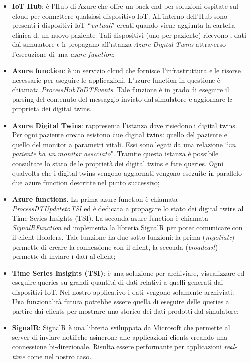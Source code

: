 \begin{itemize}

    \item \textbf{IoT Hub}: è l'Hub di Azure che offre un back-end per soluzioni ospitate sul cloud per connettere qualsiasi dispositivo IoT. All'interno dell'Hub sono presenti i dispositivi IoT ``\textit{virtuali}" creati quando viene aggiunta la cartella clinica di un nuovo paziente. Tali dispositivi (uno per paziente) ricevono i dati dal simulatore e li propagano all'istanza \textit{Azure Digital Twins} attraverso l'esecuzione di una \textit{azure function};
    
    \item \textbf{Azure function}: è un servizio cloud che fornisce l'infrastruttura e le risorse necessarie per eseguire le applicazioni. L'azure function in questione è chiamata \textit{ProcessHubToDTEvents}. Tale funzione è in grado di eseguire il parsing del contenuto del messaggio inviato dal simulatore e aggiornare le proprietà dei digital twins.
    
    \item \textbf{Azure Digital Twins}: rappresenta l'istanza dove risiedono i digital twins. Per ogni paziente creato esistono due digital twins: quello del paziente e quello del monitor a parametri vitali. Essi sono legati da una relazione ``\textit{un paziente ha un monitor associato}". Tramite questa istanza è possibile consultare lo stato delle proprietà dei digital twins e fare queries. Ogni qualvolta che i digital twins vengono aggiornati vengono eseguite in parallelo due azure function descritte nel punto successivo;
    
    \item \textbf{Azure functions}. La prima azure function è chiamata \textit{ProcessDTUpdatetoTSI} ed è dedicata a propagare lo stato dei digital twins al Time Series Insights (TSI). La seconda azure function è chiamata \textit{SignalRFunction} ed implementa la libreria SignalR per poter comunicare con il client Hololens. Tale funzione ha due sotto-funzioni: la prima (\textit{negotiate}) permette di creare la connessione con il client, la seconda (\textit{broadcast}) permette di inviare i dati al client;
    
    \item \textbf{Time Series Insights (TSI)}: è una soluzione per archiviare, visualizzare ed eseguire queries su grandi quantità di dati relativi a quelli generati dai dispositivi IoT. Nel nostro applicativo i dati vengono solamente archiviati. Una funzionalità futura potrebbe essere quella di eseguire delle queries a partire dai clients per mostrare uno storico dei dati prodotti dal simulatore;
    
    \item \textbf{SignalR}: SignalR è una libreria sviluppata da Microsoft che permette al server di inviare notifiche asincrone alle applicazioni clients creando una connessione bi-direzionale. Risulta essere performante per applicazioni \textit{real-time} come nel nostro caso.
\end{itemize}

